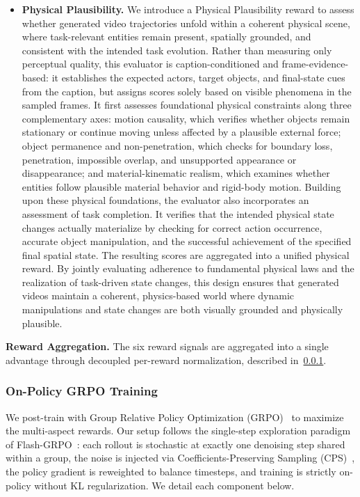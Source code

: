 \begin{itemize}
    
    \item \textbf{Physical Plausibility.}
    We introduce a Physical Plausibility reward to assess whether generated video trajectories unfold within a coherent physical scene, where task-relevant entities remain present, spatially grounded, and consistent with the intended task evolution. 
    Rather than measuring only perceptual quality, this evaluator is caption-conditioned and frame-evidence-based: it establishes the expected actors, target objects, and final-state cues from the caption, but assigns scores solely based on visible phenomena in the sampled frames.
    It first assesses foundational physical constraints along three complementary axes: motion causality, which verifies whether objects remain stationary or continue moving unless affected by a plausible external force; object permanence and non-penetration, which checks for boundary loss, penetration, impossible overlap, and unsupported appearance or disappearance; and material-kinematic realism, which examines whether entities follow plausible material behavior and rigid-body motion.
    Building upon these physical foundations, the evaluator also incorporates an assessment of task completion. It verifies that the intended physical state changes actually materialize by checking for correct action occurrence, accurate object manipulation, and the successful achievement of the specified final spatial state.
    The resulting scores are aggregated into a unified physical reward. By jointly evaluating adherence to fundamental physical laws and the realization of task-driven state changes, this design ensures that generated videos maintain a coherent, physics-based world where dynamic manipulations and state changes are both visually grounded and physically plausible.
\end{itemize}

\noindent \textbf{Reward Aggregation.}
The six reward signals are aggregated into a single advantage through decoupled per-reward normalization, described in~\cref{sec:training:grpo}.

\subsubsection{On-Policy GRPO Training}
\label{sec:training:grpo}

We post-train {\method} with Group Relative Policy Optimization (GRPO)~\cite{shao2024deepseekmath,liu2025flowgrpo,xue2025dancegrpo} to maximize the multi-aspect rewards. Our setup follows the single-step exploration paradigm of Flash-GRPO~\cite{he2026flashgrpo}: each rollout is stochastic at exactly one denoising step shared within a group, the noise is injected via Coefficients-Preserving Sampling (CPS)~\cite{wang2025cps}, the policy gradient is reweighted to balance timesteps, and training is strictly on-policy without KL regularization. We detail each component below.

